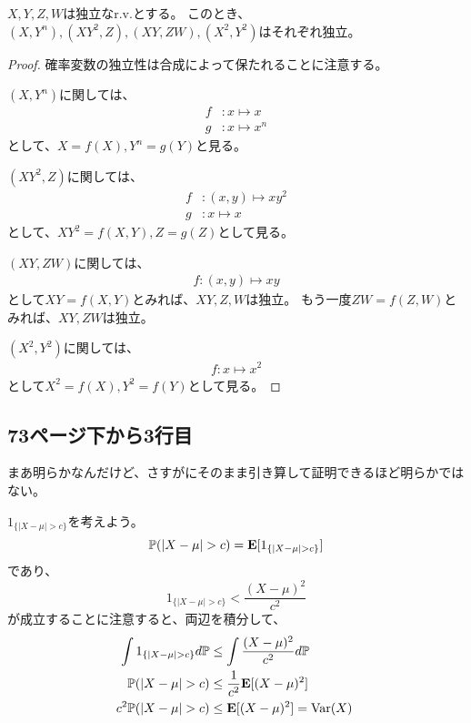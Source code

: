       \begin{lem*}
        $X,Y,Z,W$は独立なr.v.とする。
        このとき、$(X,Y^n),(XY^2,Z),(XY,ZW),(X^2,Y^2)$はそれぞれ独立。
      \end{lem*}
      \begin{proof}
        確率変数の独立性は合成によって保たれることに注意する。

        $(X,Y^n)$に関しては、
        \begin{align*}
          f &\colon x \mapsto x \\
          g &\colon x \mapsto x^n
        \end{align*}
        として、$X = f(X), Y^n = g(Y)$と見る。

        $(XY^2,Z)$に関しては、
        \begin{align*}
          f &\colon (x, y) \mapsto xy^2 \\
          g &\colon x \mapsto x
        \end{align*}
        として、$XY^2 = f(X,Y), Z = g(Z)$として見る。

        $(XY,ZW)$に関しては、
        \begin{align*}
          f \colon (x, y) \mapsto xy
        \end{align*}
        として$XY = f(X,Y)$とみれば、$XY,Z,W$は独立。
        もう一度$ZW = f(Z,W)$とみれば、$XY,ZW$は独立。

        $(X^2,Y^2)$に関しては、
        \begin{align*}
          f \colon x \mapsto x^2
        \end{align*}
        として$X^2 = f(X), Y^2 = f(Y)$として見る。
      \end{proof}

    \subsection{73ページ下から3行目}
      まあ明らかなんだけど、さすがにそのまま引き算して証明できるほど明らかではない。

      $1_{\{|X - \mu| > c\}}$を考えよう。
      \[
        {\mathbb{P}}(|X - \mu| > c) = {\mathbf{E}}[1_{\{|X - \mu| > c\}}]
      \]
      であり、
      \[
        1_{\{|X - \mu| > c\}} < \frac{(X - \mu)^2}{c^2}
      \]
      が成立することに注意すると、両辺を積分して、
      \begin{align*}
        \int 1_{\{|X - \mu| > c\}} d{\mathbb{P}} &\leq \int \frac{(X - \mu)^2}{c^2} d{\mathbb{P}} \\
        {\mathbb{P}}(|X - \mu| > c) & \leq \frac{1}{c^2}{\mathbf{E}}[(X - \mu)^2] \\
        c^2 {\mathbb{P}}(|X - \mu| > c) & \leq {\mathbf{E}}[(X - \mu)^2] = {\text{Var}}(X)\
      \end{align*}

